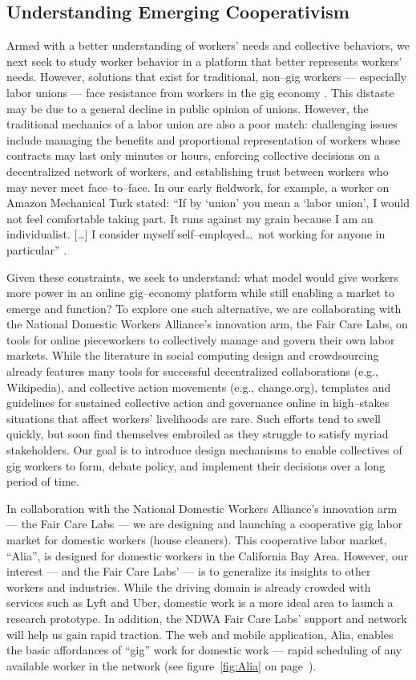 \documentclass[11pt]{article}
\begin{document}
\subsection{Understanding Emerging Cooperativism}\label{Alia}
Armed with a better understanding of workers' needs and collective behaviors,
we next seek to study worker behavior in a platform that better represents workers' needs.
However, solutions that exist for traditional, non--gig workers
--- especially labor unions ---
face resistance from workers in the gig economy
\citep{martin2014being,dynamo}.
This distaste may be due to a general decline in public opinion of unions.
However,
the traditional mechanics of a labor union are also a poor match: challenging issues include managing the benefits and proportional representation of workers whose contracts may last only minutes or hours,
enforcing collective decisions on a decentralized network of workers,
and establishing trust between workers who may never meet face--to--face.
In our early fieldwork, for example,
a worker on Amazon Mechanical Turk stated:
``If by `union' you mean a `labor union',
I would not feel comfortable taking part.
It runs against my grain because I am an individualist.
[\dots] I consider myself self--employed\dots~not working for anyone in particular''
\citep{dynamo}.

Given these constraints,
we seek to understand:
what model would give workers more power in an online gig--economy platform
while still enabling a market to emerge and function?
To explore one such alternative,
we are collaborating with the National Domestic Workers Alliance's innovation arm,
the Fair Care Labs,
on tools for online pieceworkers to collectively manage and govern their own labor markets.
While the literature in
social computing design and
crowdsourcing
already features many tools for successful decentralized collaborations
(e.g., Wikipedia),
and collective action movements
(e.g., change.org),
templates and guidelines for
sustained collective action and
governance online in high--stakes situations
that affect workers' livelihoods are rare.
Such efforts tend to swell quickly,
but soon find themselves embroiled as they struggle to satisfy myriad stakeholders.
Our goal is to introduce design mechanisms
to enable collectives of gig workers to form,
debate policy,
and implement their decisions over a long period of time.

In collaboration with
the National Domestic Workers Alliance's innovation arm
--- the Fair Care Labs ---
we are designing and launching a cooperative gig labor market for
domestic workers (house cleaners).
This cooperative labor market, ``Alia'',
is designed for domestic workers in the California Bay Area.
However, our interest
--- and the Fair Care Labs' ---
is to generalize its insights to other workers and industries.
While the driving domain is already crowded with services such as Lyft and Uber,
domestic work is a more ideal area to launch a research prototype.
In addition,
the NDWA Fair Care Labs' support and network will help us gain rapid traction.
The web and mobile application,
Alia, enables the basic affordances of ``gig'' work for domestic work
--- rapid scheduling of any available worker in the network
(see figure~\ref{fig:Alia} on page~\pageref{fig:Alia}).
\end{document}
